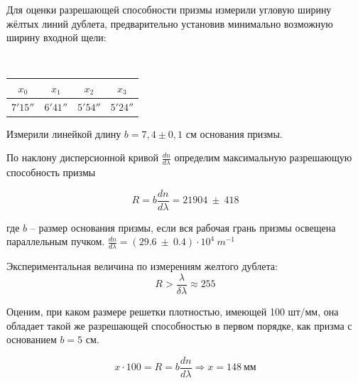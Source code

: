	Для оценки разрешающей способности призмы измерили угловую ширину жёлтых линий дублета, предварительно установив минимально возможную ширину входной щели:
	\begin{center}
		\\
		\vspace{0.4cm}
		\begin{tabular}{|c|c|c|c|}
			\hline
			$x_0$ & $x_1$ & $x_2$ & $x_3$ \\ \hline
			$7'15''$  & $6'41''$ & $5'54''$ & $5'24''$ \\ \hline
		\end{tabular}
	\end{center}
	Измерили линейкой длину $b=7{,}4\pm0{,}1$ см основания призмы.
	
	По наклону дисперсионной кривой $\frac{d n}{d \lambda}$ определим максимальную разрешающую способность призмы
	
	\begin{equation}
		R = b \frac{d n}{d \lambda} = 21904 ~ \pm ~ 418
	\end{equation}
	
	где $b$ -- размер основания призмы, если вся рабочая грань призмы освещена параллельным пучком. $\frac{d n}{d \lambda} = (29.6 ~ \pm ~ 0.4) \cdot 10^4 ~ m^{-1}$
	
	Экспериментальная величина по измерениям желтого дублета:
	\[ R > \frac{\lambda}{\delta \lambda} \approx 255 \] 
	
	Оценим, при каком размере решетки плотностью, имеющей 100 шт/мм, она обладает такой же разрешающей способностью в первом порядке, как призма с основанием $b = 5$ см.
	
	\[ x \cdot 100 = R = b \frac{d n}{d \lambda} \Rightarrow x = 148 ~ \text{мм} \] 
	
